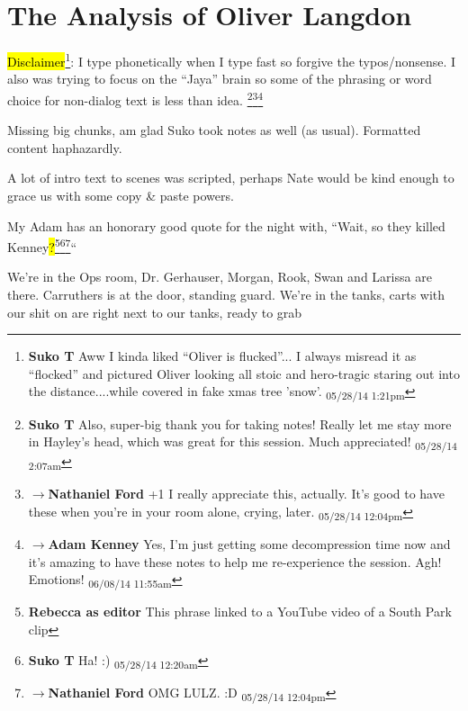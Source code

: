 \setcounter{chapter}{ 24 }
\chapter{\textbf{The Analysis of Oliver Langdon} }



\subChapterTitle{}


\hl{Disclaimer}\footnote{\textbf{Suko T }Aww I kinda liked ``Oliver is flucked''... I always misread it as ``flocked'' and pictured Oliver looking all stoic and hero-tragic staring out into the distance....while covered in fake xmas tree 'snow'. \textsubscript{05/28/14 1:21pm}}: I type phonetically when I type fast so forgive the typos/nonsense.  I also was trying to focus on the ``Jaya'' brain so some of the phrasing or word choice for non-dialog text is less than idea. \footnote{\textbf{Suko T }Also, super-big thank you for taking notes!  Really let me stay more in Hayley's head, which was great for this session.  Much appreciated! \textsubscript{05/28/14 2:07am}}\footnote{$\rightarrow$\textbf{Nathaniel Ford }+1 I really appreciate this, actually. It's good to have these when you're in your room alone, crying, later. \textsubscript{05/28/14 12:04pm}}\footnote{$\rightarrow$\textbf{Adam Kenney }Yes, I'm just getting some decompression time now and it's amazing to have these notes to help me re-experience the session. Agh! Emotions! \textsubscript{06/08/14 11:55am}}



Missing big chunks, am glad Suko took notes as well (as usual).  Formatted content haphazardly.



A lot of intro text to scenes was scripted, perhaps Nate would be kind enough to grace us with some copy \& paste powers. 

 

My Adam has an honorary good quote for the night with, ``Wait, so they killed Kenney\hl{?}\footnote{\textbf{Rebecca as editor }This phrase linked to a YouTube video of a South Park clip}\footnote{\textbf{Suko T }Ha! :) \textsubscript{05/28/14 12:20am}}\footnote{$\rightarrow$\textbf{Nathaniel Ford }OMG LULZ. :D \textsubscript{05/28/14 12:04pm}}``  



We're in the Ops room, Dr. Gerhauser, Morgan, Rook, Swan and Larissa are there.  Carruthers is at the door, standing guard.  We're in the tanks, carts with our shit on are right next to our tanks, ready to grab

